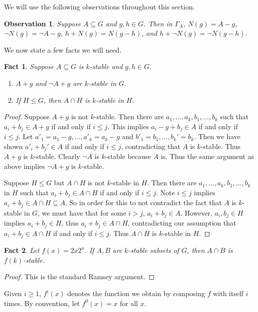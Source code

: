 \documentclass[11pt]{article}
\newtheorem{observation}{Observation}
\newtheorem{fact}{Fact}
\theoremstyle{definition}
\begin{document}
We will use the following observations throughout this section.
\begin{observation}
Suppose $A\subseteq G$ and $g, h\in G$.  Then in $\Gamma_A$, $N(g)=A-g$, $\neg N(g)=\neg A-g$, $h+N(g)=N(g-h)$, and $h+\neg N(g)=\neg N(g-h)$.
\end{observation}

We now state a few facts we will need.

\begin{fact}\label{stillstable}
Suppose $A\subseteq G$ is $k$-stable and $g,h\in G$.  
\begin{enumerate}
\item $A+g$ and $\neg A+g$ are $k$-stable in $G$.
\item If $H\leq G$, then $A\cap H$ is $k$-stable in $H$.
\end{enumerate}
\end{fact}
\begin{proof}
Suppose $A+g$ is not $k$-stable.  Then there are $a_1,\ldots, a_k,b_1,\ldots, b_k$ such that $a_i+b_j\in A+g$ if and only if $i\leq j$.  This implies $a_i-g+b_j\in A$ if and only if $i\leq j$.  Let $a'_1=a_1-g,\ldots, a'_k=a_k-g$ and $b'_1=b_1,\ldots, b_k'=b_k$.  Then we have shown $a'_i+b_j'\in A$ if and only if $i\leq j$, contradicting that $A$ is $k$-stable.  Thus $A+g$ is $k$-stable.  Clearly $\neg A$ is $k$-stable because $A$ is.  Thus the same argument as above implies $\neg A+g$ is $k$-stable.

Suppose $H\leq G$ but $A\cap H$ is not $k$-stable in $H$.  Then there are $a_1,\ldots, a_k,b_1,\ldots, b_k$ in $H$ such that $a_i+b_j\in A\cap H$ if and only if $i\leq j$.  Note $i\leq j$ implies $a_i+b_j\in A\cap H\subseteq A$.  So in order for this to not contradict the fact that $A$ is $k$-stable in $G$, we must have that for some $i>j$, $a_i+b_j\in A$.  However, $a_i,b_j\in H$ implies $a_i+b_j\in H$, thus $a_i+b_j\in A\cap H$, contradicting our assumption that $a_i+b_j\in A\cap H$ if and only if $i\leq j$. Thus $A\cap H$ is $k$-stable in $H$.
\end{proof}

\begin{fact}\label{stillstable1}
Let $f(x)=2x2^x$.  If $A,B$ are $k$-stable subsets of $G$, then $A\cap B$ is $f(k)$-stable.
\end{fact}
\begin{proof}
This is the standard Ramsey argument.
\end{proof}

Given $i\geq 1$, $f^i(x)$ denotes the function we obtain by composing $f$ with itself $i$ times. By convention, let $f^0(x)=x$ for all $x$.
\end{document}
